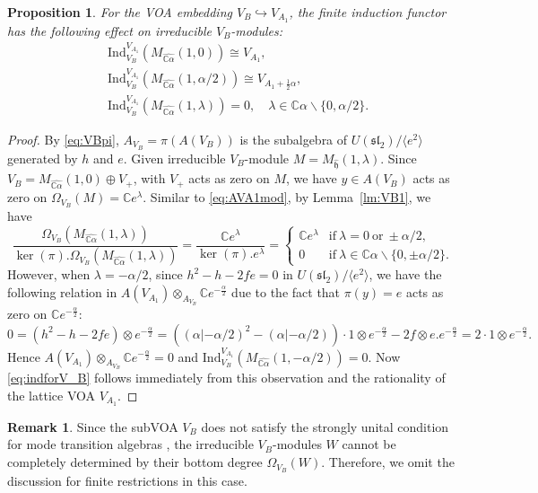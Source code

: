\documentclass[12pt,a4paper,reqno]{amsart}
\numberwithin{equation}{section}
\numberwithin{equation}{section}
\newtheorem{prop}[thm]{Proposition}
\theoremstyle{definition}
\newtheorem{remark}[thm]{Remark}
\def \C {\mathbb{C}}
\def\la{\lambda}
\def \al{\alpha}
\def\hr{\hookrightarrow}
\def \op {\oplus}
\def \h {\mathfrak{h}}
\def\Ind{\mathrm{Ind}}
\def \bs {\backslash}
\def\o{\otimes}
\def\Om{\Omega}
\def\<{\langle}
\def\>{\rangle}
\def\Ind{\mathrm{Ind}}
\def\sl{\mathfrak{sl}}
\begin{document}
	\begin{prop}
		For the VOA embedding $V_B\hr V_{A_1}$, the finite induction functor has the following effect on irreducible $V_B$-modules:  
		\begin{equation}\label{eq:indforV_B}
			\begin{aligned}
				& \mathrm{Ind}_{V_B}^{V_{A_1}} (M_{\widehat{\C\al}}(1,0)) \cong V_{A_1},\\
				& \mathrm{Ind}_{V_B}^{V_{A_1}}(M_{\widehat{\C\al}}(1,\al/2))\cong V_{A_1+\frac{1}{2}\al},\\
				& \mathrm{Ind}_{V_B}^{V_{A_1}}(M_{\widehat{\C\al}}(1,\la))=0,\quad \la\in \C\al\bs\{0,\al/2\}.
			\end{aligned}
		\end{equation}
	\end{prop}
	\begin{proof}
		By \eqref{eq:VBpi}, $A_{V_B}=\pi(A(V_B))$ is the subalgebra of $U(\sl_2)/\<e^2\>$ generated by $h$ and $e$. Given irreducible $V_B$-module $M=M_{\hat{\h}}(1,\la)$. Since $ V_B=M_{\widehat{\C\al}}(1,0)\op V_+$, with $V_+$ acts as zero on $M$, we have $y\in A(V_B)$ acts as zero on $\Om_{V_B}(M)=\C e^\la$. Similar to  \eqref{eq:AVA1mod}, by Lemma~\ref{lm:VB1}, we have 
		$$
		\frac{\Om_{V_B}(M_{\widehat{\C\al}}(1,\la))}{\ker(\pi). \Om_{V_B}(M_{\widehat{\C\al}}(1,\la))}=
		\frac{\C e^\la}{\ker(\pi). e^\la}
		=\begin{cases}
			\C e^\la& \mathrm{if}\ \la=0\ \mathrm{or}\ \pm\al/2,\\
			0&\mathrm{if}\ \la\in \C\al\bs\{0,\pm\al/2\}. 
		\end{cases} 
		$$
		However, when $\la=-\al/2$, since $h^2-h-2fe=0$ in $U(\sl_2)/\<e^2\>$, we have the following relation in $A(V_{A_1})\o_{A_{V_B}} \C e^{-\frac{\al}{2}}$ due to the fact that $\pi(y)=e$ acts as zero on $ \C e^{-\frac{\al}{2}}$: 
		$$0=(h^2-h-2fe)\o e^{-\frac{\al}{2}}=\left((\al|-\al/2)^2-(\al|-\al/2)\right)\cdot 1\o e^{-\frac{\al}{2}}-2f\o e.e^{-\frac{\al}{2}}=2\cdot 1\o e^{-\frac{\al}{2}}. $$
		Hence $A(V_{A_1})\o_{A_{V_B}} \C e^{-\frac{\al}{2}}=0$ and $\Ind^{V_{A_1}}_{V_B}(M_{\widehat{\C\al}}(1,-\al/2))=0$. Now \eqref{eq:indforV_B} follows immediately from this observation and the rationality of the lattice VOA $V_{A_1}$. 
	\end{proof}
	
	\begin{remark}
		Since the subVOA $V_B$ does not satisfy the strongly unital condition for mode transition algebras , the irreducible $V_B$-modules $W$ cannot be completely determined by their bottom degree $\Om_{V_B}(W)$. Therefore, we omit the discussion for finite restrictions in this case. 
	\end{remark}
	
\end{document}
